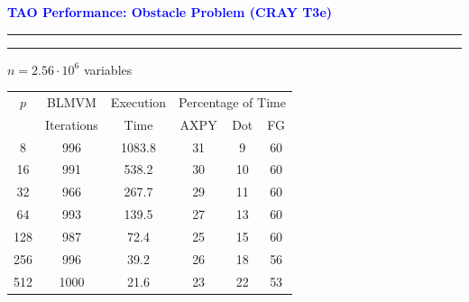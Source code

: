\documentclass{seminar}
\newcommand{\redstripe}{\textcolor{red}{\hrule height 2.0pt\hfil}
             \vspace{-1.8pt}
             \textcolor{red}{\hrule height 1.0pt\hfil}
}
\newcommand{\heading}[1]{%
   \centerline{\textcolor{blue}{\textbf{#1}}}%
    \redstripe%
    \bigskip
}
\begin{document}
\begin{slide}
\heading{TAO Performance: Obstacle Problem (CRAY T3e)}

\centerline{$ n = 2.56 \cdot 10^6 $ variables}

\begin{table}[bhpt]
\small
\begin{center}
\begin{tabular}{|cccccc|}
\hline
\multicolumn{1}{|c|}{$p$} &
\multicolumn{1}{c|}{BLMVM} &
\multicolumn{1}{c|}{Execution} &
\multicolumn{3}{c|}{Percentage of Time} \\
\multicolumn{1}{|c|}{}&
\multicolumn{1}{|c|}{Iterations}&
\multicolumn{1}{c|}{Time}&
\multicolumn{1}{c}{AXPY}&
\multicolumn{1}{c}{Dot} &
\multicolumn{1}{c|}{FG} \\
\hline
8 & 996 & 1083.8 & 31  & 9 & 60 \\ %
16 & 991 & 538.2 & 30 & 10 & 60 \\ %
32 & 966 & 267.7 & 29 & 11 & 60 \\ %
64 & 993 & 139.5 & 27 & 13 & 60 \\ %
128 & 987 & 72.4 & 25 & 15 & 60 \\ %
256 & 996 & 39.2 & 26 & 18 & 56 \\ %
512 & 1000 & 21.6 & 23 & 22 & 53 \\
\hline
\end{tabular}
\label{routines}
\end{center}
\end{table}

\vfill

\end{slide}
\end{document}
